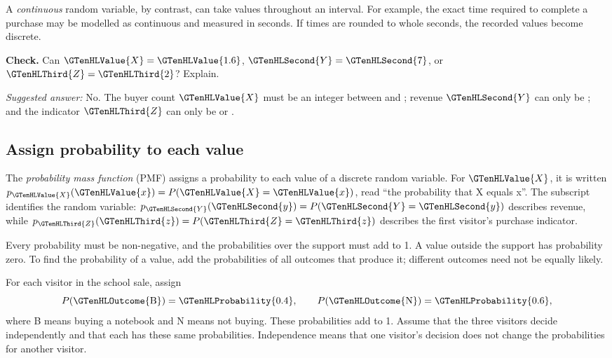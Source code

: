 A \emph{continuous} random variable, by contrast, can take values throughout an interval. For example, the exact time required to complete a purchase may be modelled as continuous and measured in seconds. If times are rounded to whole seconds, the recorded values become discrete.

\textbf{Check.} Can $\GTenHLValue{X}=\GTenHLValue{1.6}$, $\GTenHLSecond{Y}=\GTenHLSecond{7}$, or $\GTenHLThird{Z}=\GTenHLThird{2}$? Explain.

\emph{Suggested answer:} No. The buyer count $\GTenHLValue{X}$ must be an integer between  and ; revenue $\GTenHLSecond{Y}$ can only be ; and the indicator $\GTenHLThird{Z}$ can only be  or .




\subsection{Assign probability to each value}
\label{subsec:t2-c1-assign-probability-to-each-value}

The \emph{probability mass function} (PMF) assigns a probability to each value of a discrete random variable. For $\GTenHLValue{X}$, it is written $p_{\GTenHLValue{X}}(\GTenHLValue{x})=P(\GTenHLValue{X}=\GTenHLValue{x})$, read ``the probability that X equals x''. The subscript identifies the random variable: $p_{\GTenHLSecond{Y}}(\GTenHLSecond{y})=P(\GTenHLSecond{Y}=\GTenHLSecond{y})$ describes revenue, while $p_{\GTenHLThird{Z}}(\GTenHLThird{z})=P(\GTenHLThird{Z}=\GTenHLThird{z})$ describes the first visitor's purchase indicator.

Every probability must be non-negative, and the probabilities over the support must add to 1. A value outside the support has probability zero. To find the probability of a value, add the probabilities of all outcomes that produce it; different outcomes need not be equally likely.

For each visitor in the school sale, assign
\[
P(\GTenHLOutcome{\mathrm{B}})=\GTenHLProbability{0.4},\qquad P(\GTenHLOutcome{\mathrm{N}})=\GTenHLProbability{0.6},
\]
where B means buying a notebook and N means not buying. These probabilities add to 1. Assume that the three visitors decide independently and that each has these same probabilities. Independence means that one visitor's decision does not change the probabilities for another visitor.

